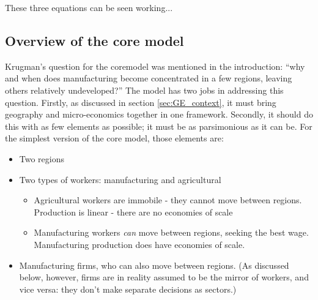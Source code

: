 
These three equations can be seen working...



\subsection{Overview of the core model \label{sec:overview_coremodel}}

Krugman's question for the \gls{coremodel} was mentioned in the introduction: ``why and when does manufacturing become concentrated in a few regions, leaving others relatively undeveloped?'' The model has two jobs in addressing this question. Firstly, as discussed in section \ref{sec:GE_context}, it must bring geography and micro-economics together in one framework. Secondly, it should do this with as few elements as possible; it must be as parsimonious as it can be. For the simplest version of the core model, those elements are:

\begin{itemize}
	\item Two regions
	\item Two types of workers: manufacturing and agricultural
		\begin{itemize}
			\item Agricultural workers are immobile - they cannot move between regions. Production is linear - there are no economies of scale
			\item Manufacturing workers \emph{can} move between regions, seeking the best wage. Manufacturing production does have economies of scale.
		\end{itemize}	
	\item Manufacturing firms, who can also move between regions. (As discussed below, however, firms are in reality assumed to be the mirror of workers, and vice versa: they don't make separate decisions as sectors.)
\end{itemize}

